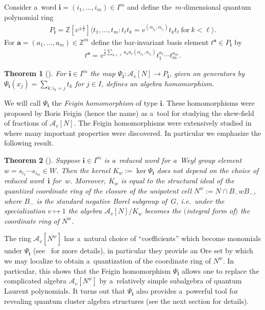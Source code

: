\documentclass[pdftex]{sigma}
\numberwithin{equation}{section}
\newtheorem{Theorem}{Theorem}[section]
\begin{document}
Consider a~word $\mathbf{i}=(i_1,\ldots,i_m)\in I^m$ and def\/ine the~$m$-dimensional quantum polynomial ring
\begin{gather*}
P_\mathbf{i}=\mathbb{Z}[v^{\pm\frac{1}{2}}]\langle t_1,\ldots,t_m: t_\ell t_k=v^{(\alpha_{i_k},\alpha_{i_\ell})}t_k t_\ell
\ \text{for} \ k<\ell\rangle.
\end{gather*}
For $\mathbf{a}=(a_1,\ldots,a_m)\in\mathbb{Z}^m$ def\/ine the bar-invariant basis element $t^\mathbf{a}\in P_\mathbf{i}$
by
\begin{gather*}
t^\mathbf{a}=v^{\frac{1}{2}\sum\limits_{k<\ell}a_k a_\ell(\alpha_{i_k},\alpha_{i_\ell})}t_1^{a_1}\cdots t_m^{a_m}.
\end{gather*}

\begin{Theorem}[\cite{berenstein}] For $\mathbf{i}\in I^m$ the map $\Psi_\mathbf{i}: \mathcal{A}_v[N]\to P_\mathbf{i}$, given on
generators by $\Psi_\mathbf{i}(x_j)=\sum\limits_{k: i_k=j}t_k$ for $j\in I$, defines an algebra homomorphism.
\end{Theorem}
We will call $\Psi_\mathbf{i}$ the \emph{Feigin homomorphism} of type $\mathbf{i}$.
These homomorphisms were proposed by Boris Feigin (hence the name) as a~tool for studying the skew-f\/ield of fractions of $\mathcal{A}_v[N]$.
The Feigin homomorphisms were extensively studied in~\cite{berenstein, iohara-malikov,joseph} where many important
properties were discovered.
In particular we emphasize the following result.
\begin{Theorem}[\cite{berenstein}]
\label{th:ideal}
Suppose $\mathbf{i}\!\in\! I^m$ is a~reduced word for a~Weyl group element \mbox{$w=s_{i_1}\cdots s_{i_m}{\in} W$}.
Then the kernel $K_w:=\operatorname{ker}\Psi_\mathbf{i}$ does not depend on the choice of reduced word~$\mathbf{i}$
for~$w$.
Moreover, $K_w$ is equal to the structural ideal of the quantized coordinate ring of the closure of the unipotent cell
$N^w:=N\cap B_-wB_-$, where $B_-$ is the standard negative Borel subgroup of~$G$, i.e.~under the specialization
$v\mapsto 1$ the algebra $\mathcal{A}_v[N]/K_w$ becomes the $($integral form of$)$ the coordinate ring of $\overline{N^w}$.
\end{Theorem}

The ring $\mathcal{A}_v[\overline{N^w}]$ has a~natural choice of ``coef\/f\/icients'' which become monomials under
$\Psi_\mathbf{i}$ (see~\cite[Section~6]{berenstein-rupel} for more details), in particular they provide an Ore set by
which we may localize to obtain a~quantization of the coordinate ring of $N^w$.
In particular, this shows that the Feigin homomorphism $\Psi_\mathbf{i}$ allows one to replace the complicated algebra
$\mathcal{A}_v[N^w]$ by a~relatively simple subalgebra of quantum Laurent polynomials.
It turns out that $\Psi_\mathbf{i}$ also provides a~powerful tool for revealing quantum cluster algebra structures (see the next section for details).
\end{document}
